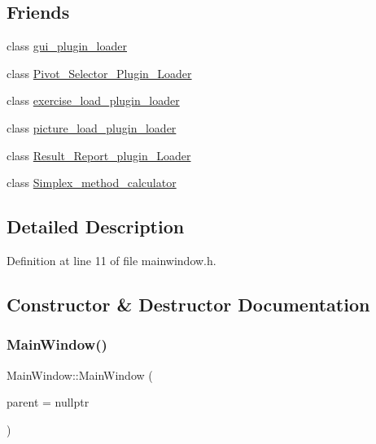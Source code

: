 \subsection*{Friends}
\begin{DoxyCompactItemize}
\item 
class \hyperlink{classMainWindow_a9762517abc1c30aa1289cf8dc2560b3d}{gui\+\_\+plugin\+\_\+loader}
\item 
class \hyperlink{classMainWindow_a6ea4c13e2ee3a46ce7f59f0baaf4feca}{Pivot\+\_\+\+Selector\+\_\+\+Plugin\+\_\+\+Loader}
\item 
class \hyperlink{classMainWindow_a2ae02a3574508e653447a544639a0fe0}{exercise\+\_\+load\+\_\+plugin\+\_\+loader}
\item 
class \hyperlink{classMainWindow_acf22a6b2f20681439abffae3722aca85}{picture\+\_\+load\+\_\+plugin\+\_\+loader}
\item 
class \hyperlink{classMainWindow_a238e01801020c0ea22d30739cbfc35f1}{Result\+\_\+\+Report\+\_\+plugin\+\_\+\+Loader}
\item 
class \hyperlink{classMainWindow_aa57bcac61e09f9c999a2f048dc923409}{Simplex\+\_\+method\+\_\+calculator}
\end{DoxyCompactItemize}


\subsection{Detailed Description}


Definition at line 11 of file mainwindow.\+h.



\subsection{Constructor \& Destructor Documentation}
\mbox{\label{classMainWindow_a996c5a2b6f77944776856f08ec30858d}} 
\subsubsection{\texorpdfstring{Main\+Window()}{MainWindow()}}
{\footnotesize\ttfamily Main\+Window\+::\+Main\+Window (\begin{DoxyParamCaption}\item[{Q\+Widget $\ast$}]{parent = {\ttfamily nullptr} }\end{DoxyParamCaption})\hspace{0.3cm}{\ttfamily [explicit]}}



